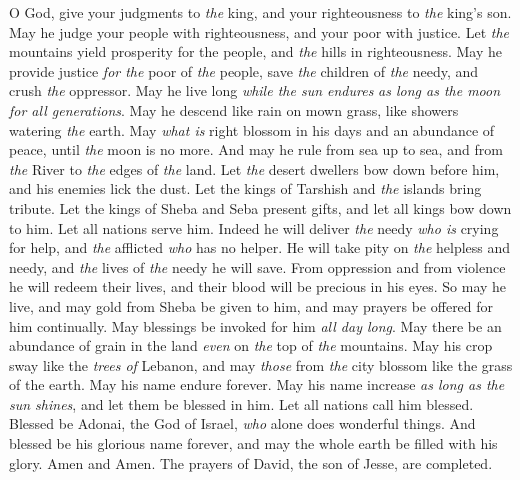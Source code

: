 \begin{biblechapter} %
 O God, give your judgments to \textit{the} king, 
and your righteousness to \textit{the} king’s son.
\verse May he judge your people with righteousness, 
and your poor with justice.
\verse Let \textit{the} mountains yield prosperity for the people, 
and \textit{the} hills in righteousness.
\verse May he provide justice \textit{for the} poor of \textit{the} people, 
save \textit{the} children of \textit{the} needy, 
and crush \textit{the} oppressor.
\verse May he live long \textit{while the sun endures} 
\textit{as long as the moon} \textit{for all generations}.
\verse May he descend like rain on mown grass, 
like showers watering \textit{the} earth.
\verse May \textit{what is} right blossom in his days 
and an abundance of peace, until \textit{the} moon is no more.
\verse And may he rule from sea up to sea, 
and from \textit{the} River to \textit{the} edges of \textit{the} land.
\verse Let \textit{the} desert dwellers bow down before him, 
and his enemies lick the dust.
\verse Let the kings of Tarshish and \textit{the} islands bring tribute. 
Let the kings of Sheba and Seba present gifts,
\verse and let all kings bow down to him. 
Let all nations serve him.
\verse Indeed he will deliver \textit{the} needy \textit{who is} crying for help, 
and \textit{the} afflicted \textit{who} has no helper.
\verse He will take pity on \textit{the} helpless and needy, 
and \textit{the} lives of \textit{the} needy he will save.
\verse From oppression and from violence 
he will redeem their lives, 
and their blood will be precious in his eyes.
\verse So may he live, and may gold from Sheba be given to him, 
and may prayers be offered for him continually. 
May blessings be invoked for him \textit{all day long}.
\verse May there be an abundance of grain in the land 
\textit{even} on \textit{the} top of \textit{the} mountains. 
May his crop sway like the \textit{trees of} Lebanon, 
and may \textit{those} from \textit{the} city blossom like the grass of the earth.
\verse May his name endure forever. 
May his name increase \textit{as long as the sun shines}, 
and let them be blessed in him. 
Let all nations call him blessed.
\verse Blessed be Adonai, the God of Israel, 
\textit{who} alone does wonderful things.
\verse And blessed be his glorious name forever, 
and may the whole earth be filled with his glory. 
Amen and Amen.
\verse The prayers of David, the son of Jesse, are completed.
\end{biblechapter}

